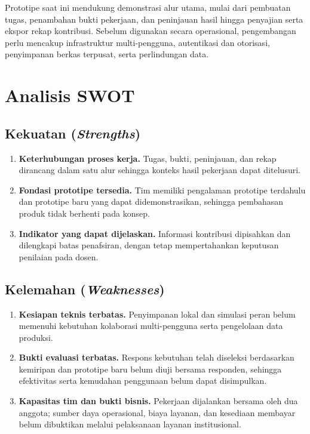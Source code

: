 \documentclass[12pt,a4paper,oneside]{report}
\begin{document}
Prototipe saat ini mendukung demonstrasi alur utama, mulai dari pembuatan tugas, penambahan bukti pekerjaan, dan peninjauan hasil hingga penyajian serta ekspor rekap kontribusi. Sebelum digunakan secara operasional, pengembangan perlu mencakup infrastruktur multi-pengguna, autentikasi dan otorisasi, penyimpanan berkas terpusat, serta perlindungan data.

\section{Analisis SWOT}
\subsection{Kekuatan (\textit{Strengths})}
\begin{enumerate}
\item \textbf{Keterhubungan proses kerja.} Tugas, bukti, peninjauan, dan rekap dirancang dalam satu alur sehingga konteks hasil pekerjaan dapat ditelusuri.
\item \textbf{Fondasi prototipe tersedia.} Tim memiliki pengalaman prototipe terdahulu dan prototipe baru yang dapat didemonstrasikan, sehingga pembahasan produk tidak berhenti pada konsep.
\item \textbf{Indikator yang dapat dijelaskan.} Informasi kontribusi dipisahkan dan dilengkapi batas penafsiran, dengan tetap mempertahankan keputusan penilaian pada dosen.
\end{enumerate}

\subsection{Kelemahan (\textit{Weaknesses})}
\begin{enumerate}
\item \textbf{Kesiapan teknis terbatas.} Penyimpanan lokal dan simulasi peran belum memenuhi kebutuhan kolaborasi multi-pengguna serta pengelolaan data produksi.
\item \textbf{Bukti evaluasi terbatas.} Respons kebutuhan telah diseleksi berdasarkan kemiripan dan prototipe baru belum diuji bersama responden, sehingga efektivitas serta kemudahan penggunaan belum dapat disimpulkan.
\item \textbf{Kapasitas tim dan bukti bisnis.} Pekerjaan dijalankan bersama oleh dua anggota; sumber daya operasional, biaya layanan, dan kesediaan membayar belum dibuktikan melalui pelaksanaan layanan institusional.
\end{enumerate}
\end{document}
